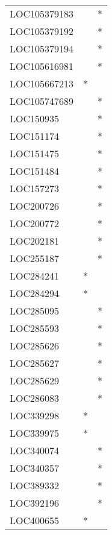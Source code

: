\begin{longtable}{lcc}
LOC105379183    &                &          * \\
LOC105379192    &                &          * \\
LOC105379194    &                &          * \\
LOC105616981    &                &          * \\
LOC105667213    &              * &            \\
LOC105747689    &                &          * \\
LOC150935       &                &          * \\
LOC151174       &                &          * \\
LOC151475       &                &          * \\
LOC151484       &                &          * \\
LOC157273       &                &          * \\
LOC200726       &                &          * \\
LOC200772       &                &          * \\
LOC202181       &                &          * \\
LOC255187       &                &          * \\
LOC284241       &              * &            \\
LOC284294       &              * &            \\
LOC285095       &                &          * \\
LOC285593       &                &          * \\
LOC285626       &                &          * \\
LOC285627       &                &          * \\
LOC285629       &                &          * \\
LOC286083       &                &          * \\
LOC339298       &              * &            \\
LOC339975       &              * &            \\
LOC340074       &                &          * \\
LOC340357       &                &          * \\
LOC389332       &                &          * \\
LOC392196       &                &          * \\
LOC400655       &              * &            \\

\end{longtable}
